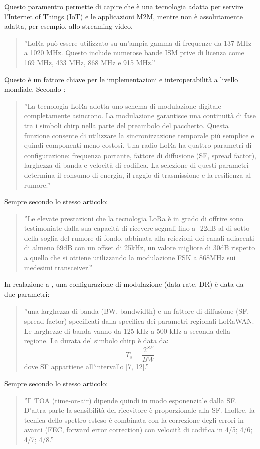 \documentclass[a4paper]{report} %
\begin{document}
Questo paramentro permette di capire che è una tecnologia adatta per servire l'Internet of Things (IoT) e le applicazioni M2M, mentre non è assolutamente adatta, per esempio, allo streaming video. 
\begin{quote}
	''LoRa può essere utilizzato su un'ampia gamma di frequenze da 137 MHz a 1020 MHz. Questo include numerose bande ISM prive di licenza come 169 MHz, 433 MHz, 868 MHz e 915 MHz.''
\end{quote}
Questo è un fattore chiave per le implementazioni e interoperabilità a livello mondiale. Secondo \cite{art:rif.23}: 
\begin{quote}
	''La tecnologia LoRa adotta uno schema di modulazione digitale completamente asincrono. La modulazione garantisce una continuità di fase tra i simboli chirp nella parte del preambolo del pacchetto. Questa funzione consente di utilizzare la sincronizzazione temporale più semplice e quindi componenti meno costosi. Una radio LoRa ha quattro parametri di configurazione: frequenza portante, fattore di diffusione (SF, spread factor), larghezza di banda e velocità di codifica. La selezione di questi parametri determina il consumo di energia, il raggio di trasmissione e la resilienza al rumore.''
\end{quote}
Sempre secondo lo stesso articolo:	
\begin{quote}	
	''Le elevate prestazioni che la tecnologia LoRa è in grado di offrire sono testimoniate dalla sua capacità di ricevere segnali fino a -22dB al di sotto della soglia del rumore di fondo, abbinata alla reiezioni dei canali adiacenti di almeno 69dB con un offset di 25kHz, un valore migliore di 30dB rispetto a quello che si ottiene utilizzando la modulazione FSK a 868MHz sui medesimi transceiver.'' 
\end{quote}
In realazione a \cite{art:rif.48}, una configurazione di modulazione (data-rate, DR) è data da due parametri:
\begin{quote}
	''una larghezza di banda (BW, bandwidth) e un fattore di diffusione (SF, spread factor) specificati dalla specifica dei parametri regionali LoRaWAN. Le larghezze di banda vanno da 125 kHz a 500 kHz a seconda della regione. La durata del simbolo chirp è data da:
	\begin{equation}
	T_s = \frac{2^{SF}}{BW}
	\end{equation}
	dove SF appartiene all'intervallo [7, 12].''
\end{quote}
Sempre secondo lo stesso articolo:
\begin{quote}
	''Il TOA (time-on-air) dipende quindi in modo esponenziale dalla SF. D'altra parte la sensibilità del ricevitore è proporzionale alla SF. Inoltre, la tecnica dello spettro esteso è combinata con la correzione degli errori in avanti (FEC, forward error correction) con velocità di codifica in {4/5; 4/6; 4/7; 4/8}.''
\end{quote}
\end{document}
